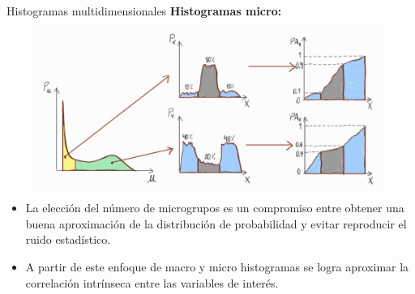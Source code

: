 \documentclass[aspectratio=169,english]{beamer}
\begin{document}
\begin{frame}[fragile]{Histogramas multidimensionales}
    \textbf{Histogramas micro:}

    \begin{figure}
        \centering
        \includegraphics[width=0.55\linewidth]{imagens/esquema4.jpeg}
        \label{fig:esquema4}
    \end{figure}

    \begin{itemize}
        \item La elección del número de microgrupos es un compromiso entre obtener una buena aproximación de la distribución de probabilidad y evitar reproducir el ruido estadístico.
        \item A partir de este enfoque de macro y micro histogramas se logra aproximar la correlación intrínseca entre las variables de interés.
    \end{itemize}



     

\end{frame}
\end{document}

